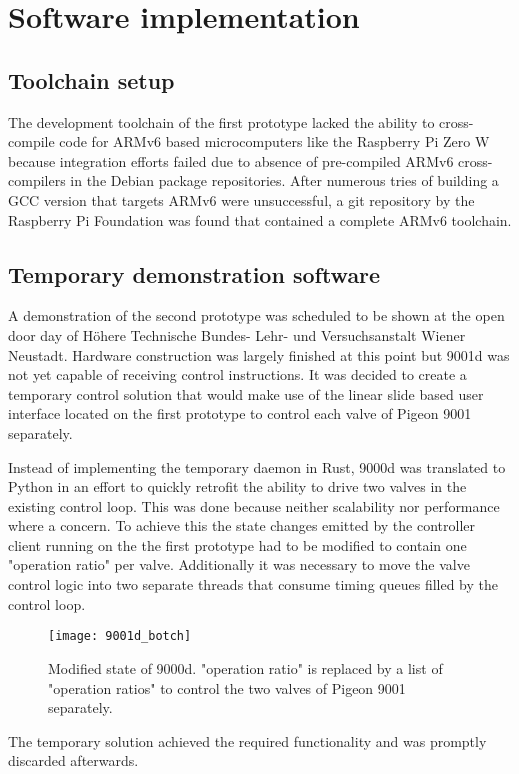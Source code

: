 \section{Software implementation}
\author{Philip Trauner}

\subsection{Toolchain setup}
The development toolchain of the first prototype lacked the ability to cross-compile code for ARMv6 based microcomputers like the Raspberry Pi Zero W because integration efforts failed due to absence of pre-compiled ARMv6 cross-compilers in the Debian package repositories. After numerous tries of building a GCC version that targets ARMv6 were unsuccessful, a git repository by the Raspberry Pi Foundation was found that contained a complete ARMv6 toolchain.

\subsection{Temporary demonstration software}
A demonstration of the second prototype was scheduled to be shown at the open door day of Höhere Technische Bundes- Lehr- und Versuchsanstalt Wiener Neustadt. Hardware construction was largely finished at this point but 9001d was not yet capable of receiving control instructions. It was decided to create a temporary control solution that would make use of the linear slide based user interface located on the first prototype to control each valve of Pigeon 9001 separately. 

Instead of implementing the temporary daemon in Rust, 9000d was translated to Python in an effort to quickly retrofit the ability to drive two valves in the existing control loop. This was done because neither scalability nor performance where a concern. To achieve this the state changes emitted by the controller client running on the the first prototype had to be modified to contain one "operation ratio" per valve. Additionally it was necessary to move the valve control logic into two separate threads that consume timing queues filled by the control loop. 

\begin{figure}[h]
\centering

\texttt{[image: 9001d\_botch]}

\caption{Modified state of 9000d. "operation ratio" is replaced by a list of "operation ratios" to control the two valves of Pigeon 9001 separately.}
\end{figure}

The temporary solution achieved the required functionality and was promptly discarded afterwards.